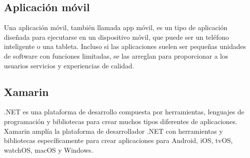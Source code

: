 \documentclass[10pt]{article}
\begin{document}
\subsection{Aplicación móvil}
\justify
Una aplicación móvil, también llamada app móvil, es un tipo de aplicación diseñada para ejecutarse en un dispositivo móvil, que puede ser un teléfono inteligente o una tableta. Incluso si las aplicaciones suelen ser pequeñas unidades de software con funciones limitadas, se las arreglan para proporcionar a los usuarios servicios y experiencias de calidad. \par\vspace{\baselineskip}


\subsection{Xamarin}
\justify
.NET es una plataforma de desarrollo compuesta por herramientas, lenguajes de programación y bibliotecas para crear muchos tipos diferentes de aplicaciones.
\justify
Xamarin amplía la plataforma de desarrollador .NET con herramientas y bibliotecas específicamente para crear aplicaciones para Android, iOS, tvOS, watchOS, macOS y Windows.
\end{document}
